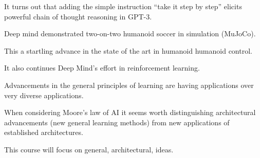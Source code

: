 {

It turns out that adding the simple instruction ``take it step by step'' elicits powerful chain of thought reasoning in GPT-3.


Deep mind demonstrated two-on-two humanoid soccer in simulation (MuJoCo).

\vfill
This a startling advance in the state of the art in humanoid humanoid control.

\vfill
It also continues Deep Mind's effort in reinforcement learning.


Advancements in the general principles of learning are having applications over very diverse applications.

\vfill
When considering Moore's law of AI it seems worth distinguishing architectural advancements (new general learning methods)
from new applications of established architectures.

\vfill
This course will focus on general, architectural, ideas.


}

